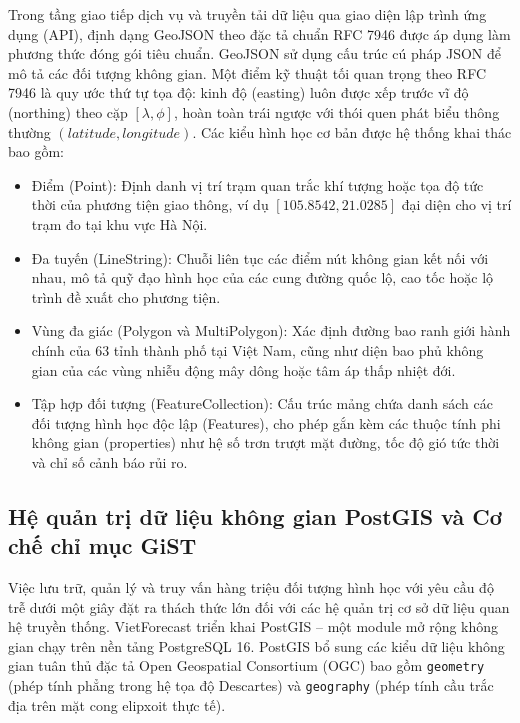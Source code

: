 Trong tầng giao tiếp dịch vụ và truyền tải dữ liệu qua giao diện lập trình ứng dụng (API), định dạng GeoJSON theo đặc tả chuẩn RFC 7946 \cite{rfc7946} được áp dụng làm phương thức đóng gói tiêu chuẩn. GeoJSON sử dụng cấu trúc cú pháp JSON để mô tả các đối tượng không gian. Một điểm kỹ thuật tối quan trọng theo RFC 7946 là quy ước thứ tự tọa độ: kinh độ (easting) luôn được xếp trước vĩ độ (northing) theo cặp $[\lambda, \phi]$, hoàn toàn trái ngược với thói quen phát biểu thông thường $(latitude, longitude)$. Các kiểu hình học cơ bản được hệ thống khai thác bao gồm:
\begin{itemize}
    \item[-] Điểm (Point): Định danh vị trí trạm quan trắc khí tượng hoặc tọa độ tức thời của phương tiện giao thông, ví dụ $[105.8542, 21.0285]$ đại diện cho vị trí trạm đo tại khu vực Hà Nội.
    \item[-] Đa tuyến (LineString): Chuỗi liên tục các điểm nút không gian kết nối với nhau, mô tả quỹ đạo hình học của các cung đường quốc lộ, cao tốc hoặc lộ trình đề xuất cho phương tiện.
    \item[-] Vùng đa giác (Polygon và MultiPolygon): Xác định đường bao ranh giới hành chính của 63 tỉnh thành phố tại Việt Nam, cũng như diện bao phủ không gian của các vùng nhiễu động mây dông hoặc tâm áp thấp nhiệt đới.
    \item[-] Tập hợp đối tượng (FeatureCollection): Cấu trúc mảng chứa danh sách các đối tượng hình học độc lập (Features), cho phép gắn kèm các thuộc tính phi không gian (properties) như hệ số trơn trượt mặt đường, tốc độ gió tức thời và chỉ số cảnh báo rủi ro.
\end{itemize}

\subsection{Hệ quản trị dữ liệu không gian PostGIS và Cơ chế chỉ mục GiST}

Việc lưu trữ, quản lý và truy vấn hàng triệu đối tượng hình học với yêu cầu độ trễ dưới một giây đặt ra thách thức lớn đối với các hệ quản trị cơ sở dữ liệu quan hệ truyền thống. VietForecast triển khai PostGIS \cite{postgis2023} -- một module mở rộng không gian chạy trên nền tảng PostgreSQL 16. PostGIS bổ sung các kiểu dữ liệu không gian tuân thủ đặc tả Open Geospatial Consortium (OGC) bao gồm \texttt{geometry} (phép tính phẳng trong hệ tọa độ Descartes) và \texttt{geography} (phép tính cầu trắc địa trên mặt cong elipxoit thực tế).

